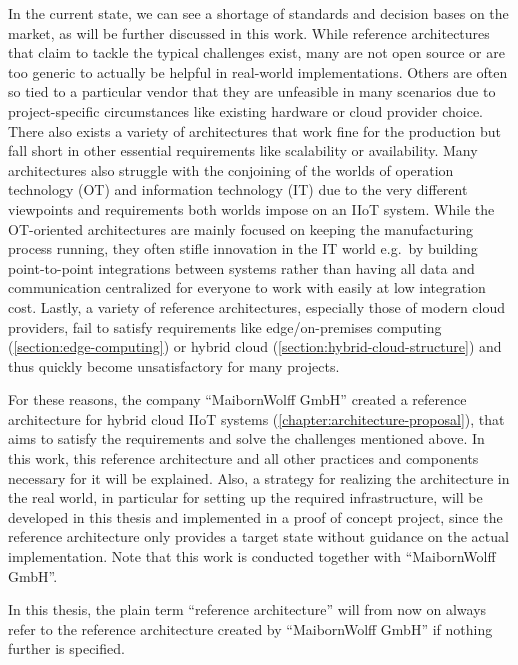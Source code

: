     In the current state, we can see a shortage of standards and decision bases on the market, as will be further discussed in this work. While reference architectures that claim to tackle the typical challenges exist, many are not open source or are too generic to actually be helpful in real-world implementations. Others are often so tied to a particular vendor that they are unfeasible in many scenarios due to project-specific circumstances like existing hardware or cloud provider choice. There also exists a variety of architectures that work fine for the production but fall short in other essential requirements like scalability or availability. Many architectures also struggle with the conjoining of the worlds of operation technology (OT) and information technology (IT) due to the very different viewpoints and requirements both worlds impose on an IIoT system. While the OT-oriented architectures are mainly focused on keeping the manufacturing process running, they often stifle innovation in the IT world e.g.\ by building point-to-point integrations between systems rather than having all data and communication centralized for everyone to work with easily at low integration cost. Lastly, a variety of reference architectures, especially those of modern cloud providers, fail to satisfy requirements like edge/on-premises computing (\autoref{section:edge-computing}) or hybrid cloud (\autoref{section:hybrid-cloud-structure}) and thus quickly become unsatisfactory for many projects. 

    For these reasons, the company ``MaibornWolff GmbH'' created a reference architecture for hybrid cloud IIoT systems (\autoref{chapter:architecture-proposal}), that aims to satisfy the requirements and solve the challenges mentioned above. In this work, this reference architecture and all other practices and components necessary for it will be explained. Also, a strategy for realizing the architecture in the real world, in particular for setting up the required infrastructure, will be developed in this thesis and implemented in a proof of concept project, since the reference architecture only provides a target state without guidance on the actual implementation. Note that this work is conducted together with ``MaibornWolff GmbH''.

    In this thesis, the plain term ``reference architecture'' will from now on always refer to the reference architecture created by ``MaibornWolff GmbH'' if nothing further is specified.
    
    